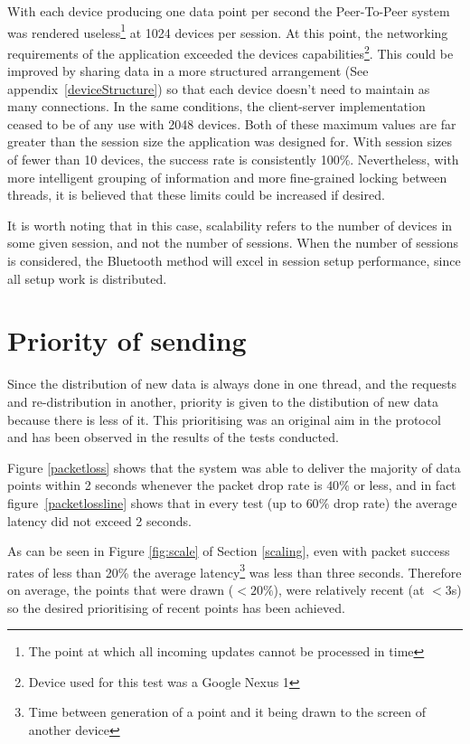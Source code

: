 With each device producing one data point per second the Peer-To-Peer system was rendered useless\footnote{The point at which all incoming updates cannot be processed in time} at 1024 devices per session. At this point, the networking requirements of the application exceeded the devices capabilities\footnote{Device used for this test was a Google Nexus 1}. This could be improved by sharing data in a more structured arrangement (See appendix~\ref{deviceStructure}) so that each device doesn't need to maintain as many connections. In the same conditions, the client-server implementation ceased to be of any use with 2048 devices.
Both of these maximum values are far greater than the session size the application was designed for. With session sizes of fewer than 10 devices, the success rate is consistently 100\%. Nevertheless, with more intelligent grouping of information and more fine-grained locking between threads, it is believed that these limits could be increased if desired.

It is worth noting that in this case, scalability refers to the number of devices in some given session, and not the number of sessions. When the number of sessions is considered, the Bluetooth method will excel in session setup performance, since all setup work is distributed.

\section{Priority of sending}

Since the distribution of new data is always done in one thread, and the requests and re-distribution in another, priority is given to the distibution of new data because there is less of it. This prioritising was an original aim in the protocol and has been observed in the results of the tests conducted.

Figure \ref{packetloss} shows that the system was able to deliver the majority of data points within 2 seconds whenever the packet drop rate is $40\%$ or less, and in fact figure~\ref{packetlossline} shows that in every test (up to $60\%$ drop rate) the average latency did not exceed 2 seconds.

As can be seen in Figure \ref{fig:scale} of Section \ref{scaling}, even with packet success rates of less than 20\% the average latency\footnote{Time between generation of a point and it being drawn to the screen of another device} was less than three seconds. Therefore on average, the points that were drawn ($<20\%$), were relatively recent (at $<3$s) so the desired prioritising of recent points has been achieved.

